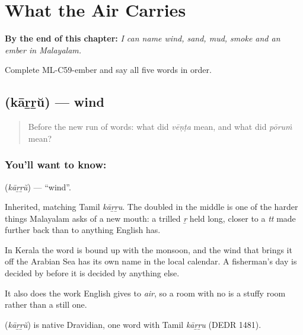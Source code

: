 
\chapter{What the Air Carries}
\label{ch:ml-what-the-air-carries}

\begin{chapteropening}
\textbf{By the end of this chapter:} \emph{I can name wind, sand, mud, smoke and an ember in Malayalam.}

Complete ML-C59-ember and say all five words in order.
\end{chapteropening}

\section[\texorpdfstring{\ml{കാറ്റ്} (kāṟṟŭ)}{കാറ്റ് (kāṟṟŭ)}]{ (kāṟṟŭ) — wind}

\label{lesson:ML-C59-wind}



\begin{quote}
Before the new run of words: what did \emph{vēṇṭa} mean, and what did \emph{pōruṁ} mean?
\end{quote}

\subsection*{You'll want to know: }
\textbf{} (\emph{kāṟṟŭ}) — \textquotedblleft{}wind\textquotedblright{}.

Inherited, matching Tamil \emph{kāṟṟu}. The doubled  in the middle is one of the harder things Malayalam asks of a new mouth: a trilled \emph{ṟ} held long, closer to a \emph{tt} made further back than to anything English has.

In Kerala the word is bound up with the monsoon, and the wind that brings it off the Arabian Sea has its own name in the local calendar. A fisherman's day is decided by  before it is decided by anything else.

It also does the work English gives to \emph{air}, so a room with no  is a stuffy room rather than a still one.

\begin{cousinweb}
\textbf{} (\emph{kāṟṟŭ}) is native Dravidian, one word with Tamil \emph{kāṟṟu} (DEDR 1481).
\end{cousinweb}

